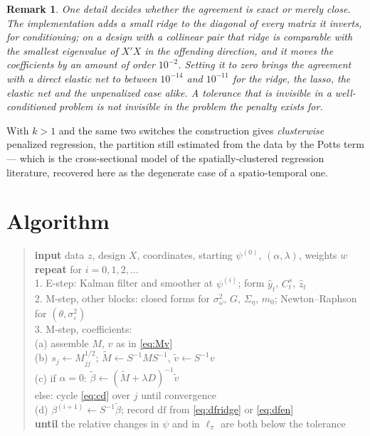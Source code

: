 \documentclass[11pt,a4paper]{article}
\newtheorem{remark}{Remark}
\newcommand{\Sig}{\Sigma}
\begin{document}
\begin{remark}
One detail decides whether the agreement is exact or merely close. The
implementation adds a small ridge to the diagonal of every matrix it inverts,
for conditioning; on a design with a collinear pair that ridge is comparable
with the smallest eigenvalue of $X'X$ in the offending direction, and it moves
the coefficients by an amount of order $10^{-2}$. Setting it to zero brings the
agreement with a direct elastic net to between $10^{-14}$ and $10^{-11}$ for
the ridge, the lasso, the elastic net and the unpenalized case alike. A
tolerance that is invisible in a well-conditioned problem is not invisible in
the problem the penalty exists for.
\end{remark}

With $k > 1$ and the same two switches the construction gives \emph{clusterwise}
penalized regression, the partition still estimated from the data by the Potts
term --- which is the cross-sectional model of the spatially-clustered
regression literature, recovered here as the degenerate case of a
spatio-temporal one.

\section{Algorithm}

\begin{quote}\small
\textbf{input} data $z$, design $X$, coordinates, starting $\psi^{(0)}$,
$(\alpha,\lambda)$, weights $w$\\[2pt]
\textbf{repeat} for $i = 0,1,2,\dots$\\
\hspace*{1em} 1. E-step: Kalman filter and smoother at $\psi^{(i)}$; form
$\hat y_t$, $C^s_t$, $\hat z_t$\\
\hspace*{1em} 2. M-step, other blocks: closed forms for $\sigma^2_\omega$,
$G$, $\Sig_\eta$, $m_0$; Newton--Raphson for $(\theta,\sigma^2_\varepsilon)$\\
\hspace*{1em} 3. M-step, coefficients:\\
\hspace*{2em} (a) assemble $M$, $v$ as in \eqref{eq:Mv}\\
\hspace*{2em} (b) $s_j \leftarrow M_{jj}^{1/2}$;
$\tilde M \leftarrow S^{-1}MS^{-1}$, $\tilde v \leftarrow S^{-1}v$\\
\hspace*{2em} (c) if $\alpha = 0$: $\tilde\beta \leftarrow
(\tilde M + \lambda D)^{-1}\tilde v$\\
\hspace*{2em} \phantom{(c)} else: cycle \eqref{eq:cd} over $j$ until
convergence\\
\hspace*{2em} (d) $\beta^{(i+1)} \leftarrow S^{-1}\tilde\beta$;
record $\mathrm{df}$ from \eqref{eq:dfridge} or \eqref{eq:dfen}\\
\textbf{until} the relative changes in $\psi$ and in $\ell_\pi$ are both below
the tolerance
\end{quote}
\end{document}
